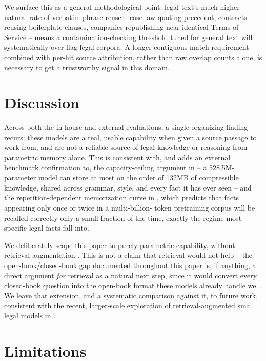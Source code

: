 \documentclass[11pt]{article}
\begin{document}
We surface this as a general methodological point: legal text's much
higher natural rate of verbatim phrase reuse -- case law quoting
precedent, contracts reusing boilerplate clauses, companies republishing
near-identical Terms of Service -- means a contamination-checking
threshold tuned for general text will systematically over-flag legal
corpora. A longer contiguous-match requirement combined with per-hit
source attribution, rather than raw overlap counts alone, is necessary to
get a trustworthy signal in this domain.

\section{Discussion}

Across both the in-house and external evaluations, a single organizing
finding recurs: these models are a real, usable capability when given a
source passage to work from, and are not a reliable source of legal
knowledge or reasoning from parametric memory alone. This is consistent
with, and adds an external benchmark confirmation to, the capacity-ceiling
argument in \citet{allenzhu2024physics} -- a 528.5M-parameter model can
store at most on the order of 132MB of compressible knowledge, shared
across grammar, style, and every fact it has ever seen -- and the
repetition-dependent memorization curve in \citet{carlini2022quantifying},
which predicts that facts appearing only once or twice in a multi-billion-
token pretraining corpus will be recalled correctly only a small fraction
of the time, exactly the regime most specific legal facts fall into.

We deliberately scope this paper to purely parametric capability, without
retrieval augmentation \citep{lewis2020rag}. This is not a claim that
retrieval would not help -- the open-book/closed-book gap documented
throughout this paper is, if anything, a direct argument \emph{for}
retrieval as a natural next step, since it would convert every closed-book
question into the open-book format these models already handle well. We
leave that extension, and a systematic comparison against it, to future
work, consistent with the recent, larger-scale exploration of
retrieval-augmented small legal models in \citet{vaddi2026smallmodels}.

\section{Limitations}
\end{document}
